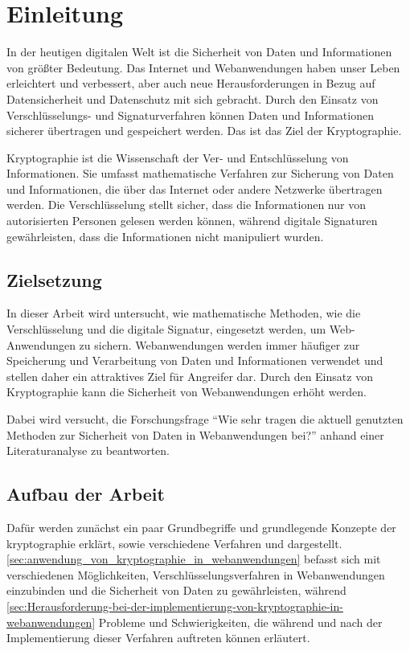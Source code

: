 \section{Einleitung}
In der heutigen digitalen Welt ist die Sicherheit von Daten und Informationen von größter Bedeutung. Das Internet und Webanwendungen haben unser Leben erleichtert und verbessert, aber auch neue Herausforderungen in Bezug auf Datensicherheit und Datenschutz mit sich gebracht. Durch den Einsatz von Verschlüsselungs- und Signaturverfahren können Daten und Informationen sicherer übertragen und gespeichert werden. Das ist das Ziel der Kryptographie.

Kryptographie ist die Wissenschaft der Ver- und Entschlüsselung von Informationen. Sie umfasst mathematische Verfahren zur Sicherung von Daten und Informationen, die über das Internet oder andere Netzwerke übertragen werden. Die Verschlüsselung stellt sicher, dass die Informationen nur von autorisierten Personen gelesen werden können, während digitale Signaturen gewährleisten, dass die Informationen nicht manipuliert wurden.

\subsection{Zielsetzung}
In dieser Arbeit wird untersucht, wie mathematische Methoden, wie die Verschlüsselung und die digitale Signatur, eingesetzt werden, um Web-Anwendungen zu sichern. Webanwendungen werden immer häufiger zur Speicherung und Verarbeitung von Daten und Informationen verwendet und stellen daher ein attraktives Ziel für Angreifer dar. Durch den Einsatz von Kryptographie kann die Sicherheit von Webanwendungen erhöht werden.

Dabei wird versucht, die Forschungsfrage \enquote{Wie sehr tragen die aktuell genutzten  Methoden zur Sicherheit von Daten in Webanwendungen bei?} anhand einer Literaturanalyse zu beantworten.


\subsection{Aufbau der Arbeit}
Dafür werden zunächst ein paar Grundbegriffe und grundlegende Konzepte der \gls{kryptographie} erklärt, sowie verschiedene  Verfahren und  dargestellt. 
\autoref{sec:anwendung_von_kryptographie_in_webanwendungen} befasst sich mit verschiedenen Möglichkeiten, Verschlüsselungsverfahren in Webanwendungen einzubinden und die Sicherheit von Daten zu gewährleisten, während  \autoref{sec:Herausforderung-bei-der-implementierung-von-kryptographie-in-webanwendungen} Probleme und Schwierigkeiten, die während und nach der Implementierung dieser Verfahren auftreten können erläutert.